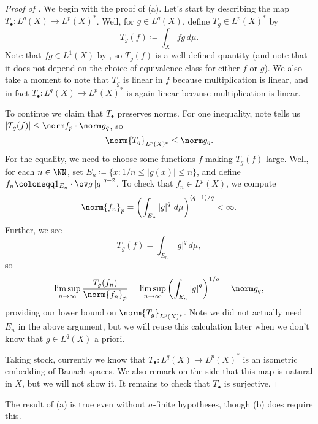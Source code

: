 \documentclass[../notes.tex]{subfiles}
\begin{document}
\begin{proof}[Proof of ]
	We begin with the proof of (a). Let's start by describing the map $T_\bullet\colon L^q(X)\to L^p(X)^*$. Well, for $g\in L^q(X)$, define $T_g\in L^p(X)^*$ by
	\[T_g(f)\coloneqq\int_Xfg\,d\mu.\]
	Note that $fg\in L^1(X)$ by , so $T_g(f)$ is a well-defined quantity (and note that it does not depend on the choice of equivalence class for either $f$ or $g$). We also take a moment to note that $T_g$ is linear in $f$ because multiplication is linear, and in fact $T_\bullet\colon L^q(X)\to L^p(X)^*$ is again linear because multiplication is linear.
	
	To continue we claim that $T_\bullet$ preserves norms. For one inequality, note  tells us $\left|T_g(f)\right|\le\norm f_p\cdot\norm g_q$, so
	\[\norm{T_g}_{L^p(X)^*}\le\norm g_q.\]
	For the equality, we need to choose some functions $f$ making $T_g(f)$ large. Well, for each $n\in\NN$, set $E_n\coloneqq\{x:1/n\le\left|g(x)\right|\le n\}$, and define $f_n\coloneqq 1_{E_n}\cdot\ov g\left|g\right|^{q-2}$. To check that $f_n\in L^p(X)$, we compute
	\[\norm{f_n}_p=\left(\int_{E_n}\left|g\right|^q\,d\mu\right)^{(q-1)/q}<\infty.\]
	Further, we see
	\[T_g(f)=\int_{E_n}\left|g\right|^q\,d\mu,\]
	so
	\[\limsup_{n\to\infty}\frac{T_g(f_n)}{\norm{f_n}_p}=\limsup_{n\to\infty}\left(\int_{E_n}\left|g\right|^q\right)^{1/q}=\norm g_q,\]
	providing our lower bound on $\norm{T_g}_{L^p(X)^*}$. Note we did not actually need $E_n$ in the above argument, but we will reuse this calculation later when we don't know that $g\in L^q(X)$ a priori.

	Taking stock, currently we know that $T_\bullet\colon L^q(X)\to L^p(X)^*$ is an isometric embedding of Banach spaces. We also remark on the side that this map is natural in $X$, but we will not show it. It remains to check that $T_\bullet$ is surjective.
\end{proof}
\begin{remark}
	The result of (a) is true even without $\sigma$-finite hypotheses, though (b) does require this.
\end{remark}
\end{document}
